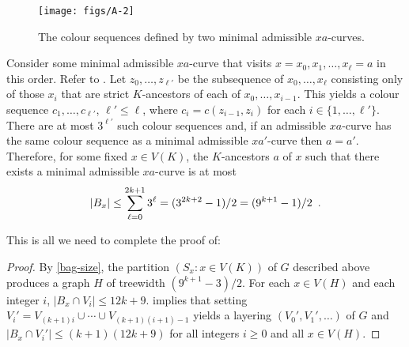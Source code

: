 \documentclass{patmorin}
\begin{document}
\begin{figure}
  \begin{center}
      \texttt{[image: figs/A-2]}
  \end{center}
  \caption{The colour sequences defined by two minimal admissible $xa$-curves.}
\end{figure}

Consider some minimal admissible $xa$-curve that visits $x=x_0,x_1,\ldots,x_\ell=a$ in this order.  Refer to .  Let $z_0,\ldots,z_{\ell'}$ be the subsequence of $x_0,\ldots,x_\ell$ consisting only of those $x_i$ that are strict $K$-ancestors of each of $x_0,\ldots,x_{i-1}$.  This yields a colour sequence $c_1,\ldots,c_{\ell'}$, $\ell'\le \ell$, where $c_i=c(z_{i-1},z_i)$ for each $i\in\{1,\ldots,\ell'\}$.   There are at most $3^{\ell'}$ such colour sequences and, if an admissible $xa$-curve has the same colour sequence as a minimal admissible $xa'$-curve then $a=a'$.  Therefore, for some fixed $x\in V(K)$, the $K$-ancestors $a$ of $x$ such that there exists a minimal admissible $xa$-curve is at most
\begin{equation}
   |B_x| \le \sum_{\ell=0}^{2k+1} 3^\ell = (3^{2k+2}-1)/2 
       = (9^{k+1}-1)/2 \enspace .  \eqlabel{bag-size}
\end{equation}

This is all we need to complete the proof of:


\begin{proof}
  By \eqref{bag-size}, the partition $(S_x:x\in V(K))$ of $G$ described above produces a graph $H$ of treewidth $(9^{k+1}-3)/2$.  For each $x\in V(H)$ and each integer $i$, $|B_x\cap V_i|\le 12k+9$.  implies that setting $V_i' = V_{(k+1)i}\cup\cdots\cup V_{(k+1)(i+1)-1}$ yields a layering $(V_0',V_1',\ldots)$ of  $G$ and $|B_x\cap V_i'|\le (k+1)(12k+9)$ for all integers $i\ge 0$ and all $x\in V(H)$.
\end{proof}



\end{document}
